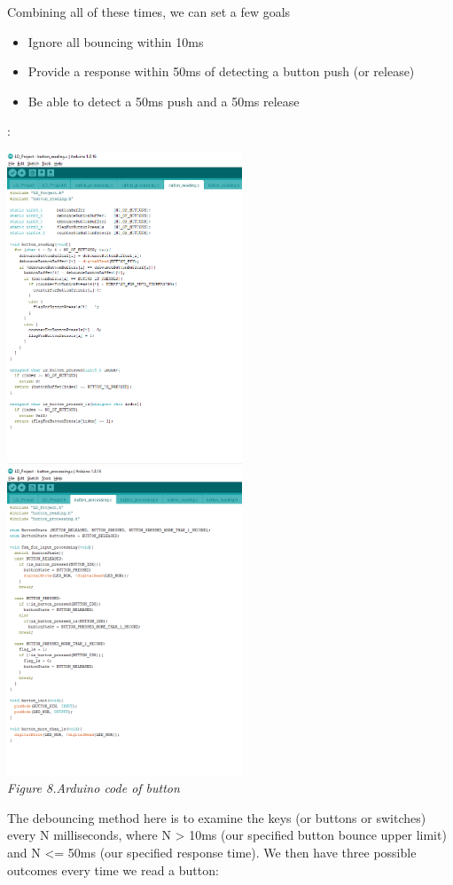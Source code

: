 \documentclass[a4paper]{article}
\begin{document}
Combining all of these times, we can set a few goals
\begin{itemize}
    \item Ignore all bouncing within 10ms
    \item Provide a response within 50ms of detecting a button push (or release)
    \item Be able to detect a 50ms push and a 50ms release
\end{itemize}
:
\medskip
\begin{center}
    \includegraphics[width=7cm]{pictures/10.png}
    \includegraphics[width=7cm]{pictures/9.png}\\
    \textit{Figure 8.Arduino code of button}\\
\end{center}
\medskip
The debouncing method here is to examine the keys (or buttons or switches) every N milliseconds, where N > 10ms (our specified button bounce upper limit) and N <= 50ms (our specified response time). We then have three possible outcomes every time we read a button:
\end{document}
